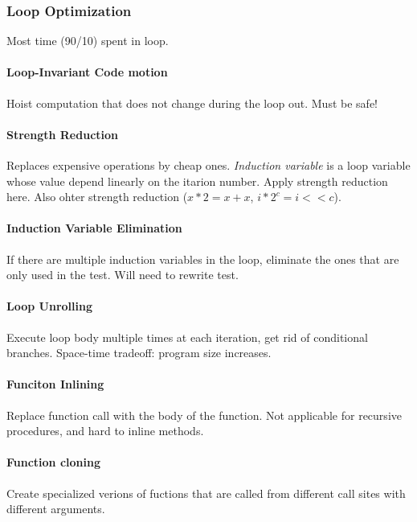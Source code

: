 \subsubsection{Loop Optimization} %
\label{ssub:Loop Optimization}
Most time (90/10) spent in loop.

\paragraph{Loop-Invariant Code motion} %
\label{par:Loop-Invariant Code motion}
Hoist computation that does not change during the loop out. Must be safe!

\paragraph{Strength Reduction} %
\label{par:Strength Reduction}
Replaces expensive operations by cheap ones. \emph{Induction variable} is a loop variable whose value depend linearly on the itarion number. Apply strength reduction here. Also ohter strength reduction ($x*2 = x+x$, $i * 2^c = i << c$).

\paragraph{Induction Variable Elimination} %
\label{par:Induction Variable Elimination}
If there are multiple induction variables in the loop, eliminate the ones that are only used in the test. Will need to rewrite test.

\paragraph{Loop Unrolling} %
\label{par:Loop Unrolling}
Execute loop body multiple times at each iteration, get rid of conditional branches. Space-time tradeoff: program size increases.

\paragraph{Funciton Inlining} %
\label{par:Funciton Inlining}
Replace function call with the body of the function. Not applicable for recursive procedures, and hard to inline methods.

\paragraph{Function cloning} %
\label{par:Function cloning}
Create specialized verions of fuctions that are called from different call sites with different arguments.

